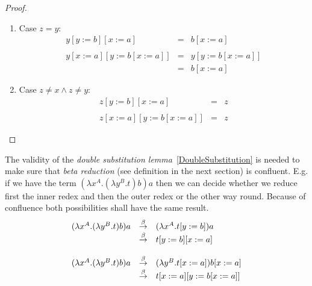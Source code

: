 \begin{lemma}
\begin{proof}
\begin{enumerate}
\begin{enumerate}
                    \item Case $z = y$:
                        $$
                        \begin{array}{llll}
                            y[y:=b][x:=a]
                            &=& b[x:=a]
                            \\
                            \\
                            y[x:=a][y:=b[x:=a]]
                            &=& y[y:=b[x:=a]]
                            \\
                            &=&b[x:=a]
                        \end{array}
                        $$

                    \item Case $z \ne x \land z \ne y$:
                        $$
                        \begin{array}{llll}
                            z[y:=b][x:=a]
                            &=& z
                            \\
                            \\
                            z[x:=a][y:=b[x:=a]]
                            &=& z
                        \end{array}
                        $$

                \end{enumerate}
        \end{enumerate}
    \end{proof}
\end{lemma}

The validity of the
\emph{double substitution lemma}~\ref{DoubleSubstitution}
is needed to make sure that \emph{beta
reduction} (see definition in the next section) is confluent. E.g. if we have
the term $(\lambda x^A. (\lambda y^B. t) b) a$ then we can decide whether we
reduce first the inner redex and then the outer redex or the other way round.
Because of confluence both possibilities shall have the same result.
$$
\begin{array}{llll}
    (\lambda x^A. (\lambda y^B. t) b) a
    &\stackrel{\beta}{\to}& (\lambda x^A. t[y:=b]) a
    \\
    &\stackrel{\beta}{\to}& t[y:=b][x:=a]
    \\
    \\
    (\lambda x^A. (\lambda y^B. t) b) a
    &\stackrel{\beta}{\to}& (\lambda y^B. t[x:=a]) b[x:=a]
    \\
    &\stackrel{\beta}{\to}& t[x:=a][y:=b[x:=a]]
\end{array}
$$









